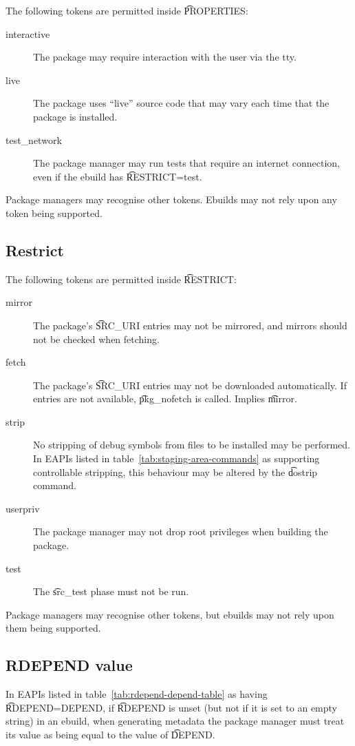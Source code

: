 The following tokens are permitted inside \t{PROPERTIES}:
\nobreakpar
\begin{description}
\item[interactive] The package may require interaction with the user via the tty.
\item[live] The package uses ``live'' source code that may vary each time that the package is
    installed.
\item[test_network] The package manager may run tests that require an internet connection, even if
    the ebuild has \t{RESTRICT=test}.
\end{description}

Package managers may recognise other tokens. Ebuilds may not rely upon any token being supported.

\subsection{Restrict}
\label{sec:restrict}

The following tokens are permitted inside \t{RESTRICT}:
\nobreakpar
\begin{description}
\item[mirror] The package's \t{SRC_URI} entries may not be mirrored, and mirrors should not be
    checked when fetching.
\item[fetch] The package's \t{SRC_URI} entries may not be downloaded automatically. If entries are
    not available, \t{pkg_nofetch} is called. Implies \t{mirror}.
\item[strip] No stripping of debug symbols from files to be installed may be performed. In EAPIs
    listed in table~\ref{tab:staging-area-commands} as supporting controllable stripping, this
    behaviour may be altered by the \t{dostrip} command.
\item[userpriv] The package manager may not drop root privileges when building the package.
\item[test] The \t{src_test} phase must not be run.
\end{description}

Package managers may recognise other tokens, but ebuilds may not rely upon them being supported.

\subsection{RDEPEND value}
\label{sec:rdepend-depend}

 In EAPIs listed in table~\ref{tab:rdepend-depend-table} as having
\t{RDEPEND=DEPEND}, if \t{RDEPEND} is unset (but not if it is set to an empty string) in an ebuild,
when generating metadata the package manager must treat its value as being equal to the value of
\t{DEPEND}.

